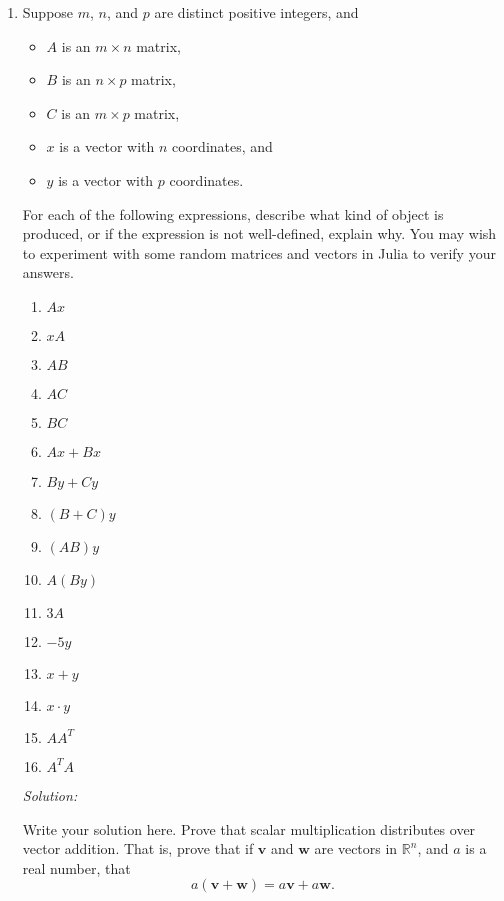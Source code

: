 \documentclass[11pt]{article}
\newcommand{\R}{\ensuremath{\mathbb R}}
\renewcommand{\vec}[1]{\ensuremath{\mathbf{#1}}}
\newenvironment{sol}
    {\emph{Solution:}
    }
\newcommand{\headings}{
\large{\textbf{YOUR NAME GOES HERE \hfill 21-241 Fall 2019}\\
\textbf{Homework 1 \hfill Due Friday, August 30}}\\
\rule[0.1in]{\textwidth}{0.01in}
}
\begin{document}
\headings

\begin{enumerate}
\section*{Required Problems}

\item Suppose $m$, $n$, and $p$ are distinct positive integers, and
\begin{itemize}
\item  $A$ is an $m \times n$ matrix, 
\item $B$ is an $n \times p$ matrix, 
\item $C$ is an $m \times p$ matrix, 
\item $x$ is a vector with $n$ coordinates, and 
\item $y$ is a vector with $p$ coordinates.
\end{itemize}

For each of the following expressions, describe what kind of object is produced, or if the expression is not well-defined, explain why. You may wish to experiment with some random matrices and vectors in Julia to verify your answers.
\begin{enumerate}
\item $Ax$
\item $xA$
\item $AB$
\item $AC$
\item $BC$
\item $Ax + Bx$
\item $By + Cy$
\item $(B+C)y$
\item $(AB)y$
\item $A(By)$
\item $3A$
\item $-5y$
\item $x+y$
\item $x \cdot y$
\item $AA^T$
\item $A^TA$
\end{enumerate}

\begin{sol}
Write your solution here.
\end{sol}


\item Prove that scalar multiplication distributes over vector addition.  That is, prove that if $\vec{v}$ and $\vec{w}$ are vectors in $\R^n$, and $a$ is a real number, that 
\[a(\vec{v}+\vec{w}) = a\vec{v} + a\vec{w}.\]


\end{enumerate}
\end{document}
